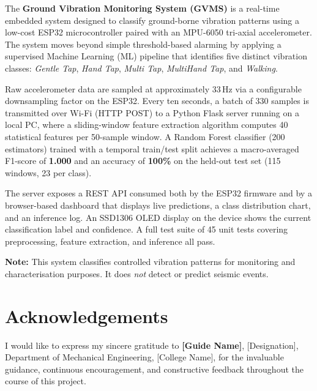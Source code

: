 \documentclass[12pt,a4paper]{report}
\begin{document}
The \textbf{Ground Vibration Monitoring System (GVMS)} is a real-time embedded
system designed to classify ground-borne vibration patterns using a low-cost
ESP32 microcontroller paired with an MPU-6050 tri-axial accelerometer. The
system moves beyond simple threshold-based alarming by applying a supervised
Machine Learning (ML) pipeline that identifies five distinct vibration classes:
\textit{Gentle Tap}, \textit{Hand Tap}, \textit{Multi Tap},
\textit{MultiHand Tap}, and \textit{Walking}.

Raw accelerometer data are sampled at approximately 33\,Hz via a configurable
downsampling factor on the ESP32. Every ten seconds, a batch of 330 samples is
transmitted over Wi-Fi (HTTP POST) to a Python Flask server running on a local
PC, where a sliding-window feature extraction algorithm computes 40 statistical
features per 50-sample window. A Random Forest classifier (200 estimators)
trained with a temporal train/test split achieves a macro-averaged F1-score of
\textbf{1.000} and an accuracy of \textbf{100\%} on the held-out test set
(115 windows, 23 per class).

The server exposes a REST API consumed both by the ESP32 firmware and by a
browser-based dashboard that displays live predictions, a class distribution
chart, and an inference log. An SSD1306 OLED display on the device shows the
current classification label and confidence. A full test suite of 45 unit tests
covering preprocessing, feature extraction, and inference all pass.

\textbf{Note:} This system classifies controlled vibration patterns for
monitoring and characterisation purposes. It does \emph{not} detect or predict
seismic events.

\newpage

\chapter*{Acknowledgements}

I would like to express my sincere gratitude to \textbf{[Guide Name]},
[Designation], Department of Mechanical Engineering, [College Name], for the
invaluable guidance, continuous encouragement, and constructive feedback
throughout the course of this project.
\end{document}
